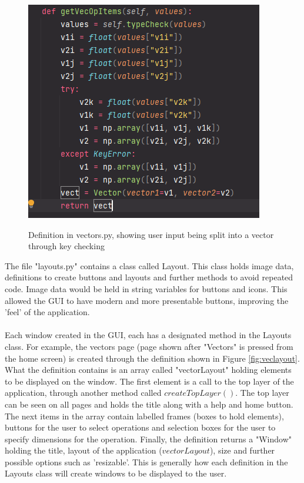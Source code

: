 \documentclass[final]{cmpreport}
\begin{document}
		\begin{figure}[H]
		\caption{Definition in vectors.py, showing user input being split into a vector through key checking}
		\centering
		\includegraphics[scale=0.7]{vectorkey.png}
		\label{fig:vecsplit}
	\end{figure}
	
	The file "layouts.py" contains a class called Layout. This class holds image data, definitions to create buttons and layouts and further methods to avoid repeated code. Image data would be held in string variables for buttons and icons. This allowed the GUI to have modern and more presentable buttons, improving the 'feel' of the application.\\
	\\Each window created in the GUI, each has a designated method in the Layouts class. For example, the vectors page (page shown after "Vectors" is pressed from the home screen) is created through the definition shown in Figure \ref{fig:veclayout}. What the definition contains is an array called "vectorLayout" holding elements to be displayed on the window. The first element is a call to the top layer of the application, through another method called $createTopLayer()$. The top layer can be seen on all pages and holds the title along with a help and home button. The next items in the array contain labelled frames (boxes to hold elements), buttons for the user to select operations and selection boxes for the user to specify dimensions for the operation. Finally, the definition returns a "Window" holding the title, layout of the application ($vectorLayout$), size and further possible options such as 'resizable'. This is generally how each definition in the Layouts class will create windows to be displayed to the user.  
\end{document}
